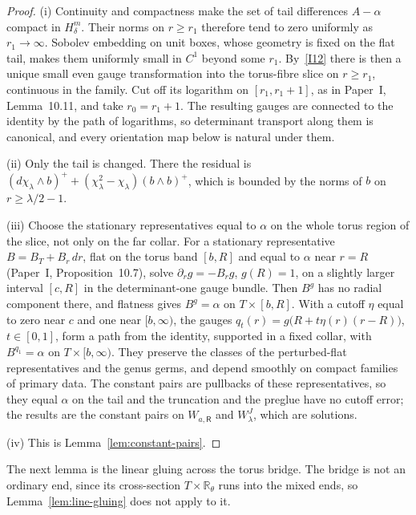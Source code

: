\documentclass[11pt]{amsart}
\theoremstyle{definition}
\theoremstyle{remark}
\theoremstyle{plain}
\numberwithin{equation}{section}
\newcommand{\RR}{\mathbb R}
\begin{document}
\begin{proof}
(i) Continuity and compactness make the set of tail differences
$A-\alpha$ compact in $H^m_\delta$. Their norms on $r\ge r_1$ therefore
tend to zero uniformly as $r_1\to\infty$. Sobolev embedding on unit
boxes, whose geometry is fixed on the flat tail, makes them uniformly
small in $C^1$ beyond some $r_1$. By~\ref{I12} there is then a
unique small even gauge transformation into the torus-fibre slice on
$r\ge r_1$, continuous in the family. Cut off its logarithm on
$[r_1,r_1+1]$, as in Paper~I, Lemma~10.11, and take $r_0=r_1+1$. The
resulting gauges are connected to the identity by the path of
logarithms, so determinant transport along them is canonical, and
every orientation map below is natural under them.

(ii) Only the tail is changed. There the residual is
$(d\chi_\lambda\wedge b)^++(\chi_\lambda^2-\chi_\lambda)(b\wedge b)^+$, which is
bounded by the norms of $b$ on $r\ge\lambda/2-1$.

(iii) Choose the stationary representatives equal to $\alpha$ on the
whole torus region of the slice, not only on the far collar. For a
stationary representative $B=B_T+B_r\,dr$, flat on the torus band
$[b,R]$ and equal to $\alpha$ near $r=R$ (Paper~I, Proposition~10.7),
solve $\partial_rg=-B_rg$, $g(R)=1$, on a slightly larger interval
$[c,R]$ in the determinant-one gauge bundle. Then $B^g$ has no radial
component there, and flatness gives $B^g=\alpha$ on $T\times[b,R]$. With
a cutoff $\eta$ equal to zero near $c$ and one near $[b,\infty)$, the
gauges $q_t(r)=g\bigl(R+t\eta(r)(r-R)\bigr)$, $t\in[0,1]$, form a path
from the identity, supported in a fixed collar, with
$B^{q_1}=\alpha$ on $T\times[b,\infty)$. They preserve the classes of the
perturbed-flat representatives and the genus germs, and depend smoothly on
compact families of primary data. The constant pairs are pullbacks of these representatives, so
they equal $\alpha$ on the tail and the truncation and the preglue have
no cutoff error; the results are the constant pairs on $W_{a,\mathsf R}$
and $W^J_\lambda$, which are solutions.

(iv) This is Lemma~\ref{lem:constant-pairs}.
\end{proof}

The next lemma is the linear gluing across the torus bridge. The
bridge is not an ordinary end, since its cross-section
$T\times\RR_\theta$ runs into the mixed ends, so
Lemma~\ref{lem:line-gluing} does not apply to it.
\end{document}

